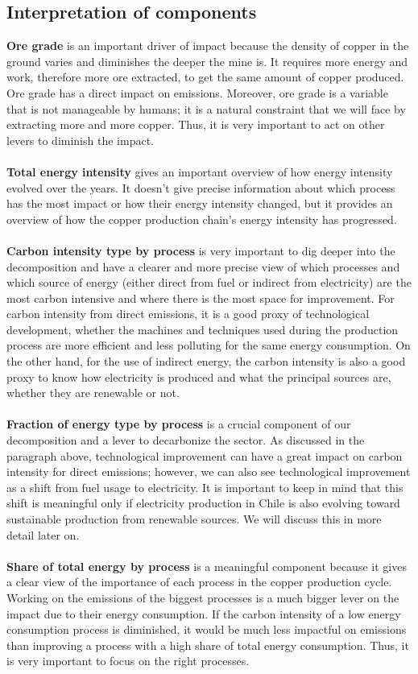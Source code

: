\subsection{Interpretation of components}
\textbf{Ore grade} is an important driver of impact because the density of copper in the ground varies and diminishes the deeper the mine is. It requires more energy and work, therefore more ore extracted, to get the same amount of copper produced. Ore grade has a direct impact on emissions. Moreover, ore grade is a variable that is not manageable by humans; it is a natural constraint that we will face by extracting more and more copper. Thus, it is very important to act on other levers to diminish the impact.
\\\\
\textbf{Total energy intensity} gives an important overview of how energy intensity evolved over the years. It doesn't give precise information about which process has the most impact or how their energy intensity changed, but it provides an overview of how the copper production chain's energy intensity has progressed.
\\\\
\textbf{Carbon intensity type by process} is very important to dig deeper into the decomposition and have a clearer and more precise view of which processes and which source of energy (either direct from fuel or indirect from electricity) are the most carbon intensive and where there is the most space for improvement. For carbon intensity from direct emissions, it is a good proxy of technological development, whether the machines and techniques used during the production process are more efficient and less polluting for the same energy consumption. On the other hand, for the use of indirect energy, the carbon intensity is also a good proxy to know how electricity is produced and what the principal sources are, whether they are renewable or not.
\\\\
\textbf{Fraction of energy type by process} is a crucial component of our decomposition and a lever to decarbonize the sector. As discussed in the paragraph above, technological improvement can have a great impact on carbon intensity for direct emissions; however, we can also see technological improvement as a shift from fuel usage to electricity. It is important to keep in mind that this shift is meaningful only if electricity production in Chile is also evolving toward sustainable production from renewable sources. We will discuss this in more detail later on.
\\\\
\textbf{Share of total energy by process} is a meaningful component because it gives a clear view of the importance of each process in the copper production cycle. Working on the emissions of the biggest processes is a much bigger lever on the impact due to their energy consumption. If the carbon intensity of a low energy consumption process is diminished, it would be much less impactful on emissions than improving a process with a high share of total energy consumption. Thus, it is very important to focus on the right processes.
